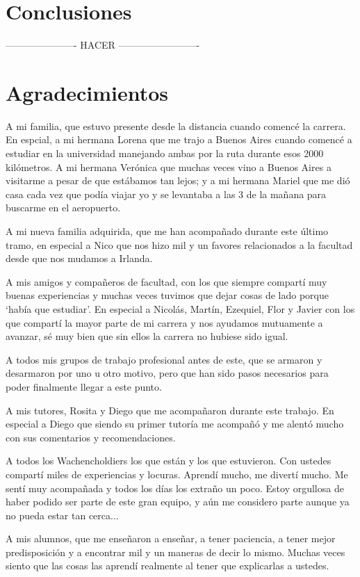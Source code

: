 \documentclass[a4paper]{article}
\begin{document}
\newpage
\section{Conclusiones}

---------------------- HACER -------------------------

\newpage
\section{Agradecimientos}

A mi familia, que estuvo presente desde la distancia cuando comencé la carrera. En espcial, a mi hermana Lorena que me trajo a Buenos Aires cuando comencé a estudiar en la universidad manejando ambas por la ruta durante esos 2000 kilómetros. A mi hermana Verónica que muchas veces vino a Buenos Aires a visitarme a pesar de que estábamos tan lejos; y a mi hermana Mariel que me dió casa cada vez que podía viajar yo y se levantaba a las 3 de la mañana para buscarme en el aeropuerto.

A mi nueva familia adquirida, que me han acompañado durante este último tramo, en especial a Nico que nos hizo mil y un favores relacionados a la facultad desde que nos mudamos a Irlanda.

A mis amigos y compañeros de facultad, con los que siempre compartí muy buenas experiencias y muchas veces tuvimos que dejar cosas de lado porque `había que estudiar'. En especial a Nicolás, Martín, Ezequiel, Flor y Javier con los que compartí la mayor parte de mi carrera y nos ayudamos mutuamente a avanzar, sé muy bien que sin ellos la carrera no hubiese sido igual.

A todos mis grupos de trabajo profesional antes de este, que se armaron y desarmaron por uno u otro motivo, pero que han sido pasos necesarios para poder finalmente llegar a este punto.

A mis tutores, Rosita y Diego que me acompañaron durante este trabajo. En especial a Diego que siendo su primer tutoría me acompañó y me alentó mucho con sus comentarios y recomendaciones.

A todos los Wachencholdiers los que están y los que estuvieron. Con ustedes compartí miles de experiencias y locuras. Aprendí mucho, me divertí mucho. Me sentí muy acompañada y todos los días los extraño un poco. Estoy orgullosa de haber podido ser parte de este gran equipo, y aún me considero parte aunque ya no pueda estar tan cerca...

A mis alumnos, que me enseñaron a enseñar, a tener paciencia, a tener mejor predisposición y a encontrar mil y un maneras de decir lo mismo. Muchas veces siento que las cosas las aprendí realmente al tener que explicarlas a ustedes.
\end{document}
